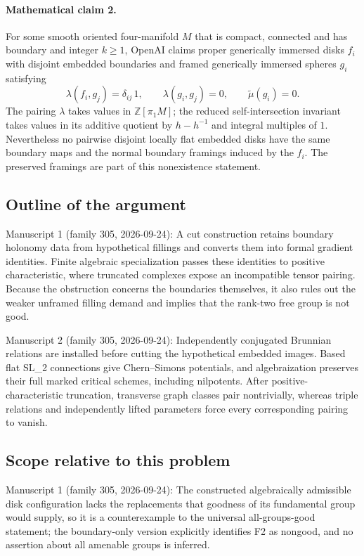 \documentclass[11pt]{article}
\begin{document}
\paragraph{Mathematical claim 2.} For some smooth oriented four-manifold $M$ that is compact, connected and has boundary and integer $k\ge1$, OpenAI claims proper generically immersed disks $f_i$ with disjoint embedded boundaries and framed generically immersed spheres $g_i$ satisfying
\[
\lambda(f_i,g_j)=\delta_{ij}\,1,\qquad\lambda(g_i,g_j)=0,\qquad\widetilde\mu(g_i)=0.
\]
The pairing $\lambda$ takes values in $\mathbb Z[\pi_1M]$; the reduced self-intersection invariant takes values in its additive quotient by $h-h^{-1}$ and integral multiples of $1$. Nevertheless no pairwise disjoint locally flat embedded disks have the same boundary maps and the normal boundary framings induced by the $f_i$. The preserved framings are part of this nonexistence statement.

\subsection{Outline of the argument}
Manuscript 1 (family 305, 2026-09-24): A cut construction retains boundary holonomy data from hypothetical fillings and converts them into formal gradient identities. Finite algebraic specialization passes these identities to positive characteristic, where truncated complexes expose an incompatible tensor pairing. Because the obstruction concerns the boundaries themselves, it also rules out the weaker unframed filling demand and implies that the rank-two free group is not good.

Manuscript 2 (family 305, 2026-09-24): Independently conjugated Brunnian relations are installed before cutting the hypothetical embedded images. Based flat SL\_2 connections give Chern--Simons potentials, and algebraization preserves their full marked critical schemes, including nilpotents. After positive-characteristic truncation, transverse graph classes pair nontrivially, whereas triple relations and independently lifted parameters force every corresponding pairing to vanish.

\subsection{Scope relative to this problem}
Manuscript 1 (family 305, 2026-09-24): The constructed algebraically admissible disk configuration lacks the replacements that goodness of its fundamental group would supply, so it is a counterexample to the universal all-groups-good statement; the boundary-only version explicitly identifies F2 as nongood, and no assertion about all amenable groups is inferred.
\end{document}
